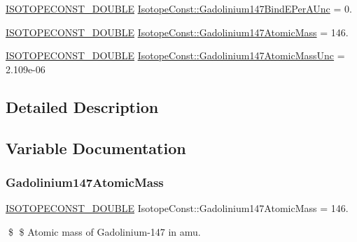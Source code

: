 \begin{DoxyCompactItemize}
\item 
\mbox{\hyperlink{group___isotope_const-_macros_ga8f45a7272ce02c0b4c65c44636ed719a}{I\+S\+O\+T\+O\+P\+E\+C\+O\+N\+S\+T\+\_\+\+D\+O\+U\+B\+LE}} \mbox{\hyperlink{group___isotope_const-_gadolinium-_gd147_ga8f73e97e2b24239ee71e0661c7b4069e}{Isotope\+Const\+::\+Gadolinium147\+Bind\+E\+Per\+A\+Unc}} = 0.
\item 
\mbox{\hyperlink{group___isotope_const-_macros_ga8f45a7272ce02c0b4c65c44636ed719a}{I\+S\+O\+T\+O\+P\+E\+C\+O\+N\+S\+T\+\_\+\+D\+O\+U\+B\+LE}} \mbox{\hyperlink{group___isotope_const-_gadolinium-_gd147_gab4844ea1f65fcdd2768288963c39ccb6}{Isotope\+Const\+::\+Gadolinium147\+Atomic\+Mass}} = 146.
\item 
\mbox{\hyperlink{group___isotope_const-_macros_ga8f45a7272ce02c0b4c65c44636ed719a}{I\+S\+O\+T\+O\+P\+E\+C\+O\+N\+S\+T\+\_\+\+D\+O\+U\+B\+LE}} \mbox{\hyperlink{group___isotope_const-_gadolinium-_gd147_gaa3a38ea1871dbad987f46f775b574fed}{Isotope\+Const\+::\+Gadolinium147\+Atomic\+Mass\+Unc}} = 2.\+109e-\/06
\end{DoxyCompactItemize}


\subsection{Detailed Description}


\subsection{Variable Documentation}
\mbox{\label{group___isotope_const-_gadolinium-_gd147_gab4844ea1f65fcdd2768288963c39ccb6}} 
\subsubsection{\texorpdfstring{Gadolinium147\+Atomic\+Mass}{Gadolinium147AtomicMass}}
{\footnotesize\ttfamily \mbox{\hyperlink{group___isotope_const-_macros_ga8f45a7272ce02c0b4c65c44636ed719a}{I\+S\+O\+T\+O\+P\+E\+C\+O\+N\+S\+T\+\_\+\+D\+O\+U\+B\+LE}} Isotope\+Const\+::\+Gadolinium147\+Atomic\+Mass = 146.}

\$ \$ Atomic mass of Gadolinium-\/147 in amu. \mbox{\label{group___isotope_const-_gadolinium-_gd147_gaa3a38ea1871dbad987f46f775b574fed}} 
